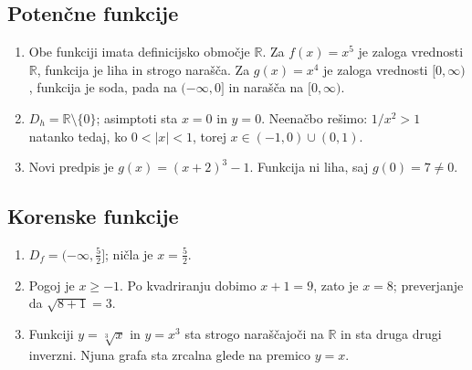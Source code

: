 \documentclass[a4paper,12pt]{article}
\begin{document}
	\subsection*{Potenčne funkcije}
	\begin{enumerate}
		\item Obe funkciji imata definicijsko območje $\mathbb{R}$. Za $f(x)=x^5$ je zaloga vrednosti $\mathbb{R}$, funkcija je liha in strogo narašča. Za $g(x)=x^4$ je zaloga vrednosti $[0,\infty)$, funkcija je soda, pada na $(-\infty,0]$ in narašča na $[0,\infty)$.
		\item $D_h=\mathbb{R}\setminus\{0\}$; asimptoti sta $x=0$ in $y=0$. Neenačbo rešimo: $1/x^2>1$ natanko tedaj, ko $0<|x|<1$, torej $x\in(-1,0)\cup(0,1)$.
		\item Novi predpis je $g(x)=(x+2)^3-1$. Funkcija ni liha, saj $g(0)=7\ne0$.
	\end{enumerate}

	\subsection*{Korenske funkcije}
	\begin{enumerate}
		\item $D_f=(-\infty,\tfrac52]$; ničla je $x=\tfrac52$.
		\item Pogoj je $x\geq-1$. Po kvadriranju dobimo $x+1=9$, zato je $x=8$; preverjanje da $\sqrt{8+1}=3$.
		\item Funkciji $y=\sqrt[3]{x}$ in $y=x^3$ sta strogo naraščajoči na $\mathbb{R}$ in sta druga drugi inverzni. Njuna grafa sta zrcalna glede na premico $y=x$.
	\end{enumerate}
\end{document}
